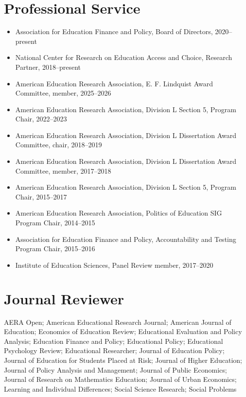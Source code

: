 \documentclass[11pt, letterpaper]{article}
\begin{document}
\section{Professional Service}
\begin{itemize}
  \item Association for Education Finance and Policy, Board of Directors, 2020--present

  \item National Center for Research on Education Access and Choice, Research Partner, 2018--present

  \item American Education Research Association, E. F. Lindquist Award Committee, member, 2025--2026

  \item American Education Research Association, Division L Section 5, Program Chair, 2022--2023

  \item American Education Research Association, Division L Dissertation Award Committee, chair, 2018--2019

  \item American Education Research Association, Division L Dissertation Award Committee, member, 2017--2018

  \item American Education Research Association, Division L Section 5, Program Chair, 2015--2017

  \item American Education Research Association, Politics of Education SIG Program Chair, 2014--2015

  \item Association for Education Finance and Policy, Accountability and Testing Program Chair, 2015--2016

  \item Institute of Education Sciences, Panel Review member, 2017--2020

\end{itemize}

\section{Journal Reviewer}
AERA Open; American Educational Research Journal; American Journal of Education; Economics of Education Review; Educational Evaluation and Policy Analysis; Education Finance and Policy; Educational Policy; Educational Psychology Review; Educational Researcher; Journal of Education Policy; Journal of Education for Students Placed at Risk; Journal of Higher Education; Journal of Policy Analysis and Management; Journal of Public Economics; Journal of Research on Mathematics Education; Journal of Urban Economics; Learning and Individual Differences; Social Science Research; Social Problems
\end{document}
